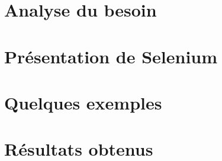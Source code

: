 \section{Analyse du besoin}
\section{Présentation de Selenium}
\section{Quelques exemples}
\section{Résultats obtenus}